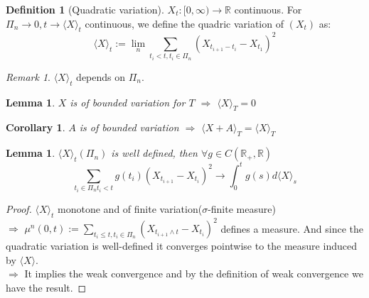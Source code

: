 \documentclass[a4paper,11pt]{book}
\newtheorem{corollary}{Corollary}[theorem]
\newtheorem{lemma}[theorem]{Lemma}
\theoremstyle{definition}
\newtheorem{definition}{Definition}[section]
\theoremstyle{remark}
\newtheorem*{remark}{Remark}
\begin{document}
\begin{definition}[Quadratic variation]
	$X_t: [0, \infty) \rightarrow \mathbb{R}$ continuous. For $\Pi_n \rightarrow 0, t \rightarrow \langle X \rangle_t$ continuous, we define the quadric variation of $(X_t)$ as:
	\begin{equation*}
		\langle X \rangle_t := \lim_n \sum_{t_i < t, t_i \in \Pi_n} (X_{t_{i+1} - t_i} - X_{t_1})^2 
	\end{equation*}
\end{definition}
\begin{remark}
$\langle X \rangle_t$ depends on $\Pi_n$.	
\end{remark}

\begin{lemma}
	$X$ is of bounded variation for $T$ $\Rightarrow$ $\langle X \rangle_T = 0$ 
\end{lemma}

\begin{corollary}
	$A$ is of bounded variation $\Rightarrow$ $\langle X + A \rangle_T = \langle X \rangle_T$
\end{corollary}

\begin{lemma}
$\langle X \rangle_t(\Pi_n)$	 is well defined, then $\forall g \in C(\mathbb{R}_+, \mathbb{R})$
\begin{equation*}
	\sum_{t_i \in \Pi_n t_i < t} g(t_i) (X_{t_{i+1}} - X_{t_i})^2 \rightarrow \int_0^t g(s)d\langle X \rangle_s
\end{equation*}
\end{lemma}
\begin{proof}
	$\langle X \rangle_t$ monotone and of finite variation($\sigma$-finite measure)\\
	$\Rightarrow$ $\mu^n(0, t) := \sum_{t_i \leq t, t_i \in \Pi_n} (X_{t_{i+1}\wedge t} - X_{t_i})^2$  defines a measure. And since the quadratic variation is well-defined it converges pointwise to the measure induced by $\langle X \rangle$.\\
	$\Rightarrow$ It implies the weak convergence and by the definition of weak convergence we have the result.
\end{proof}
\end{document}
